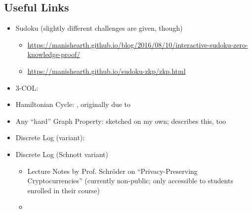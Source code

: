 \documentclass[border=1cm,varwidth=43cm]{standalone}
\newcommand{\complexityProblem}[1]{\textsf{#1}}
\begin{document}
\subsection*{Useful Links}
\begin{itemize}
	\item Sudoku (slightly different challenges are given, though)\begin{itemize}
		\item \url{https://manishearth.github.io/blog/2016/08/10/interactive-sudoku-zero-knowledge-proof/}
		\item \url{https://manishearth.github.io/sudoku-zkp/zkp.html}
	\end{itemize}
	\item \complexityProblem{3-COL}: \cite{GMW_ZK_NP_languages}
	\item Hamiltonian Cycle: \cite{wiki:zero-knowledge-proofs-hamiltonian-graphs}, originally due to \cite{BlumZeroKnowledge}
	\item Any \enquote{hard} Graph Property: sketched on my own; \cite{BlumZeroKnowledge} describes this, too
	\item Discrete Log (variant): \cite{wiki:zero-knowledge-proofs-discrete-log}
	\item Discrete Log (Schnott variant)\begin{itemize}
		\item Lecture Notes by Prof. Schröder on \enquote{Privacy-Preserving Cryptocurrencies} (currently non-public; only accessible to students enrolled in their course)
		\item \cite{SchnorrZeroKnowledge}
	\end{itemize}
\end{itemize}

\printbibliography[heading=subbibliography]
\end{document}
